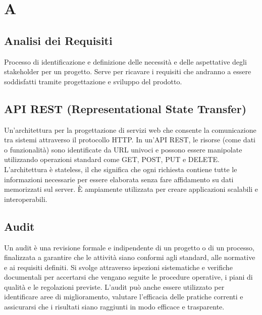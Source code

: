 \documentclass{article}
\begin{document}


\section{A}

\subsection{Analisi dei Requisiti}
Processo di identificazione e definizione delle necessità e delle aspettative degli stakeholder per un progetto. Serve per ricavare i requisiti che andranno a essere soddisfatti tramite progettazione e sviluppo del prodotto.

\subsection{API REST (Representational State Transfer)}
Un'architettura per la progettazione di servizi web che consente la comunicazione tra sistemi attraverso il protocollo HTTP. In un'API REST, le risorse (come dati o funzionalità) sono identificate da URL univoci e possono essere manipolate utilizzando operazioni standard come GET, POST, PUT e DELETE. L'architettura è stateless, il che significa che ogni richiesta contiene tutte le informazioni necessarie per essere elaborata senza fare affidamento su dati memorizzati sul server. È ampiamente utilizzata per creare applicazioni scalabili e interoperabili.

\subsection{Audit}
Un audit è una revisione formale e indipendente di un progetto o di un processo, finalizzata a garantire che le attività siano conformi agli standard, alle normative e ai requisiti definiti. Si svolge attraverso ispezioni sistematiche e verifiche documentali per accertarsi che vengano seguite le procedure operative, i piani di qualità e le regolazioni previste. L’audit può anche essere utilizzato per identificare aree di miglioramento, valutare l’efficacia delle pratiche correnti e assicurarsi che i risultati siano raggiunti in modo efficace e trasparente.
\end{document}
